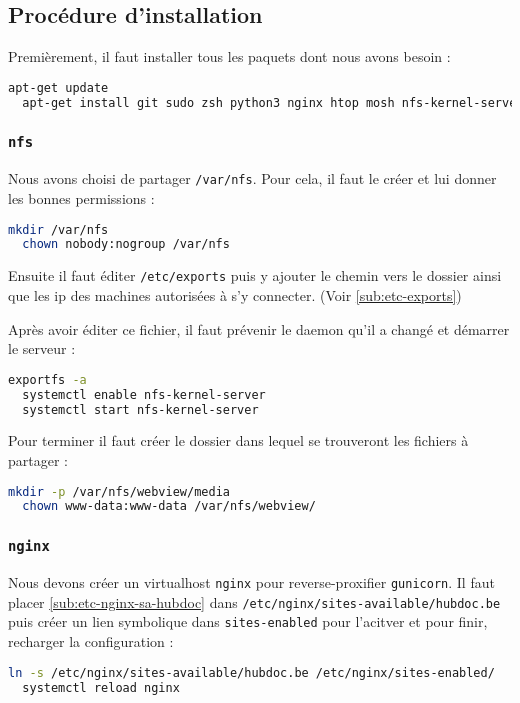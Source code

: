 \documentclass[10pt,a4paper]{article}
\begin{document}
\subsection{Procédure d'installation}

Premièrement, il faut installer tous les paquets dont nous avons besoin :
\begin{lstlisting}[language=bash]
  apt-get update
  apt-get install git sudo zsh python3 nginx htop mosh nfs-kernel-server vim redis-server postgresql-server python3 python3-dev ntpdate ntp screen iptables-persistent
\end{lstlisting}

\subsubsection{\texttt{nfs}}

Nous avons choisi de partager \texttt{/var/nfs}. Pour cela, il faut le créer et lui donner les bonnes permissions :

\begin{lstlisting}[language=bash]
  mkdir /var/nfs
  chown nobody:nogroup /var/nfs
\end{lstlisting}

Ensuite il faut éditer \texttt{/etc/exports} puis y ajouter le chemin vers
le dossier ainsi que les ip des machines autorisées à s'y connecter. (Voir \ref{sub:etc-exports})

Après avoir éditer ce fichier, il faut prévenir le daemon qu'il a changé et démarrer le serveur :
\begin{lstlisting}[language=bash]
  exportfs -a
  systemctl enable nfs-kernel-server
  systemctl start nfs-kernel-server
\end{lstlisting}

Pour terminer il faut créer le dossier dans lequel se trouveront les fichiers à partager :
\begin{lstlisting}[language=bash]
  mkdir -p /var/nfs/webview/media
  chown www-data:www-data /var/nfs/webview/
\end{lstlisting}

\subsubsection{\texttt{nginx}}

Nous devons créer un virtualhost \texttt{nginx} pour reverse-proxifier \texttt{gunicorn}.
Il faut placer \ref{sub:etc-nginx-sa-hubdoc} dans \texttt{/etc/nginx/sites-available/hubdoc.be}
puis créer un lien symbolique dans \texttt{sites-enabled} pour l'acitver et pour finir,
recharger la configuration :
\begin{lstlisting}[language=bash]
  ln -s /etc/nginx/sites-available/hubdoc.be /etc/nginx/sites-enabled/
  systemctl reload nginx
\end{lstlisting}
\end{document}
